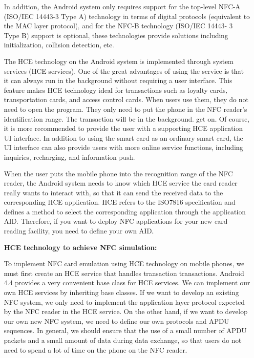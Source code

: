 \documentclass[journal]{IEEEtran}
\begin{document}
In addition, the Android system only requires support for the top-level NFC-A (ISO/IEC 14443-3 Type A) technology in terms of digital protocols (equivalent to the MAC layer protocol), and for the NFC-B technology (ISO/IEC 14443- 3 Type B) support is optional, these technologies provide solutions including initialization, collision detection, etc.

The HCE technology on the Android system is implemented through system services (HCE services). One of the great advantages of using the service is that it can always run in the background without requiring a user interface. This feature makes HCE technology ideal for transactions such as loyalty cards, transportation cards, and access control cards. When users use them, they do not need to open the program. They only need to put the phone in the NFC reader's identification range. The transaction will be in the background. get on. Of course, it is more recommended to provide the user with a supporting HCE application UI interface. In addition to using the smart card as an ordinary smart card, the UI interface can also provide users with more online service functions, including inquiries, recharging, and information push.

When the user puts the mobile phone into the recognition range of the NFC reader, the Android system needs to know which HCE service the card reader really wants to interact with, so that it can send the received data to the corresponding HCE application. HCE refers to the ISO7816 specification and defines a method to select the corresponding application through the application AID. Therefore, if you want to deploy NFC applications for your new card reading facility, you need to define your own AID.

\textbf{HCE technology to achieve NFC simulation:}

To implement NFC card emulation using HCE technology on mobile phones, we must first create an HCE service that handles transaction transactions. Android 4.4 provides a very convenient base class for HCE services. We can implement our own HCE services by inheriting base classes. If we want to develop an existing NFC system, we only need to implement the application layer protocol expected by the NFC reader in the HCE service. On the other hand, if we want to develop our own new NFC system, we need to define our own protocols and APDU sequences. In general, we should ensure that the use of a small number of APDU packets and a small amount of data during data exchange, so that users do not need to spend a lot of time on the phone on the NFC reader.
\end{document}
